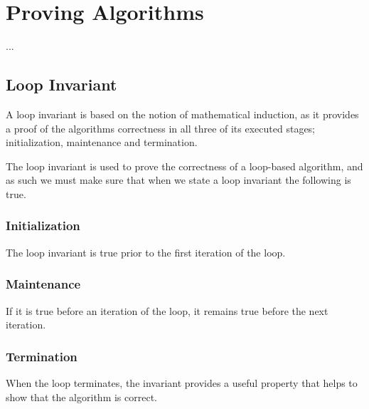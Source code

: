 
\thispagestyle{fancyplain}

\chapter{Proving Algorithms}
\label{ch:proofs}
...

\section{Loop Invariant}
\label{ch:proofs|sec:loop-invariant}
A loop invariant is based on the notion of mathematical induction, as it
provides a proof of the algorithms correctness in all three of its executed
stages; initialization, maintenance and termination.

The loop invariant is used to prove the correctness of a loop-based algorithm,
and as such we must make sure that when we state a loop invariant the
following is true.

\subsection{Initialization}
\label{ch:proofs|sec:loop-invariant|sub:initialization}
The loop invariant is true prior to the first iteration of the loop.

\subsection{Maintenance}
\label{ch:proofs|sec:loop-invariant|sub:maintenance}
If it is true before an iteration of the loop, it remains true before the next
iteration.

\subsection{Termination}
\label{ch:proofs|sec:loop-invariant|sub:termination}
When the loop terminates, the invariant provides a useful property that helps
to show that the algorithm is correct.

